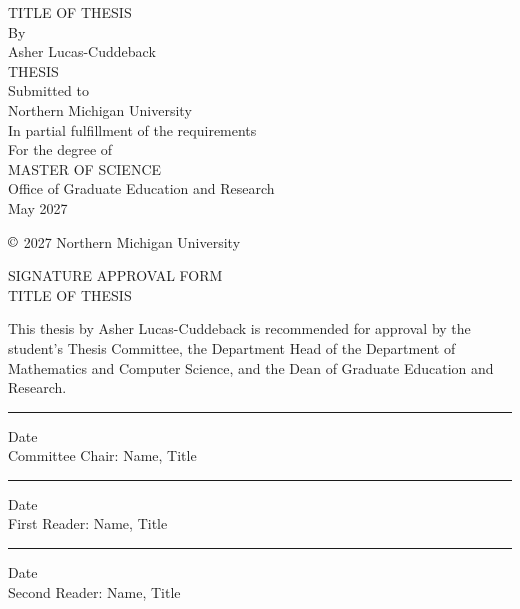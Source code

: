 \documentclass[12pt]{article}
\begin{document}

\thispagestyle{empty}
\begin{center}
\vspace*{1.5in}
TITLE OF THESIS\\[0.25in]
By\\[0.25in]
Asher Lucas-Cuddeback\\[1.25in]
THESIS\\[0.25in]
Submitted to\\
Northern Michigan University\\
In partial fulfillment of the requirements\\
For the degree of\\[0.25in]
MASTER OF SCIENCE\\[0.25in]
Office of Graduate Education and Research\\[0.25in]
May 2027

\vfill

$\copyright$ 2027 Northern Michigan University

\end{center}


\newpage
\thispagestyle{empty}
\begin{center}
SIGNATURE APPROVAL FORM\\[0.5in]
TITLE OF THESIS\\
\end{center}

This thesis by Asher Lucas-Cuddeback is recommended for approval by the student's Thesis Committee, the Department Head of the Department of Mathematics and Computer Science, and the Dean of Graduate Education and Research.

\vspace{1cm}

\noindent\rule{4.3in}{0.75pt} \hspace{0.3in} Date\\[3mm]
Committee Chair: Name, Title\\[3mm]

\noindent\rule{4.3in}{0.75pt} \hspace{0.3in} Date\\[3mm]
First Reader: Name, Title\\[3mm]

\noindent\rule{4.3in}{0.75pt} \hspace{0.3in} Date\\[3mm]
Second Reader: Name, Title\\[3mm]
\end{document}
